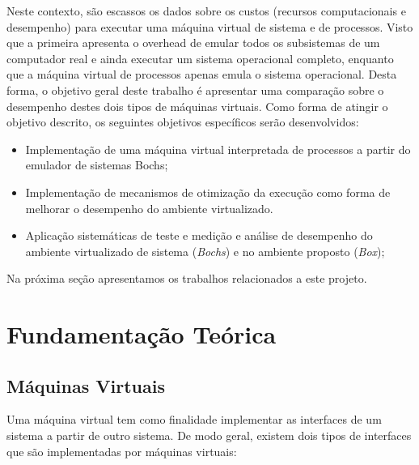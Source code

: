 \documentclass[11pt,twoside]{article}
\begin{document}
Neste contexto, são escassos os dados sobre os custos (recursos computacionais e desempenho) para executar uma máquina virtual de sistema e de processos. 
Visto que a primeira apresenta o overhead de emular todos os subsistemas de um computador real e ainda executar um sistema operacional completo, enquanto que a máquina virtual de processos apenas emula o sistema operacional.
Desta forma, o objetivo geral deste trabalho é apresentar uma comparação sobre o desempenho destes dois tipos de máquinas virtuais.
Como forma de atingir o objetivo descrito, os seguintes objetivos específicos serão desenvolvidos:

\begin{itemize}
 \item Implementação de uma máquina virtual interpretada de processos a partir do emulador de sistemas Bochs;
 \item Implementação de mecanismos de otimização da execução como forma de melhorar o desempenho do ambiente virtualizado.
 \item Aplicação sistemáticas de teste e medição e análise de desempenho do ambiente virtualizado de sistema (\emph{Bochs}) e no ambiente proposto (\emph{Box});
\end{itemize} 

Na próxima seção apresentamos os trabalhos relacionados a este projeto.

\section{Fundamentação Teórica}

\subsection{Máquinas Virtuais}

Uma máquina virtual tem como finalidade implementar as interfaces de um sistema a partir de outro sistema.
De modo geral, existem dois tipos de interfaces que são implementadas por máquinas virtuais:
\end{document}
